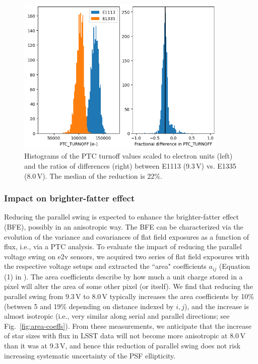 \begin{figure}[ht]
\begin{centering}
\includegraphics[width=0.9\textwidth]{figures/PtcTurnoffRatio.png}
\end{centering}
\caption{Histograms of the PTC turnoff values scaled to electron units (left) and the ratios of
differences (right) between E1113 (9.3\,V) vs. E1335 (8.0\,V). The median of
the reduction is 22\%.}
\label{fig:ptc-turnoff}
\end{figure}



\subsubsection{Impact on brighter-fatter effect}\label{impact-on-brighter-fatter-effect}

Reducing the parallel swing is expected to enhance the brighter-fatter
effect (BFE), possibly in an anisotropic way. The BFE can be
characterized via the evolution of the variance and covariances of
flat field exposures as a function of flux, i.e., via a PTC analysis. To evaluate the
impact of reducing the parallel voltage swing on e2v sensors, we
acquired two series of flat field exposures with the respective voltage
setups and extracted the ``area" coefficients $a_{ij}$
(Equation (1) in \citet{2023A&A...670A.118A}).
The area coefficients describe by how much a unit charge stored in
a pixel will alter the area of some other pixel (or itself). We find that
reducing the parallel swing from 9.3\,V to 8.0\,V typically increases the
area coefficients by 10\% (between 5 and 19\% depending on distance indexed by $i,j$),
and the increase is almost isotropic (i.e., very similar along serial and parallel
directions; see Fig.~\ref{fig:area-coeffs}). From these measurements, we anticipate that the increase of
star sizes with flux in LSST data will not become more anisotropic at 8.0\,V than it was at
9.3\,V, and hence this reduction of parallel swing does not 
risk increasing systematic uncertainty of the PSF ellipticity.

